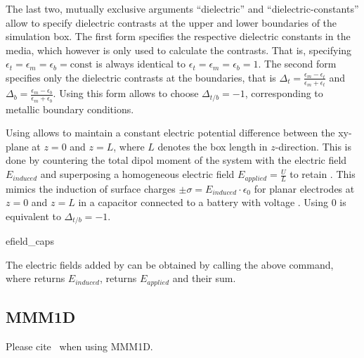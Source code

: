 The last two, mutually exclusive arguments ``dielectric'' and
``dielectric-constants'' allow to specify dielectric contrasts at the
upper and lower boundaries of the simulation box. The first form
specifies the respective dielectric constants in the media, which
however is only used to calculate the contrasts. That is, specifying 
$\epsilon_t=\epsilon_m=\epsilon_b=\text{const}$ is always identical to
$\epsilon_t=\epsilon_m=\epsilon_b=1$. The second form specifies only
the dielectric contrasts at the boundaries, that is
$\Delta_t=\frac{\epsilon_m-\epsilon_t}{\epsilon_m+\epsilon_t}$ and
$\Delta_b=\frac{\epsilon_m-\epsilon_b}{\epsilon_m+\epsilon_b}$. Using
this form allows to choose $\Delta_{t/b}=-1$, corresponding to
metallic boundary conditions.

Using   allows to maintain a constant 
electric potential difference  between the xy-plane at $z=0$ 
and $z=L$, where $L$ denotes the box length in $z$-direction.
This is done by countering the total dipol moment of
the system with the electric field $E_{induced}$ and superposing 
a homogeneous electric field $E_{applied} = \frac{U}{L}$ 
to retain . This mimics the induction of surface charges
$\pm\sigma = E_{induced} \cdot \epsilon_0$ for planar electrodes at $z=0$ 
and $z=L$ in a capacitor connected to a battery with voltage .
Using  0 is equivalent to $\Delta_{t/b}=-1$.

\begin{essyntax}
  efield_caps 
  \begin{features}
  \end{features}
\end{essyntax}

The electric fields added by   can be obtained 
by calling the above command, where  returns $E_{induced}$,
 returns $E_{applied}$ and  their sum.

\subsection{MMM1D}

\begin{citebox}
  Please cite~ when using MMM1D.
\end{citebox}

